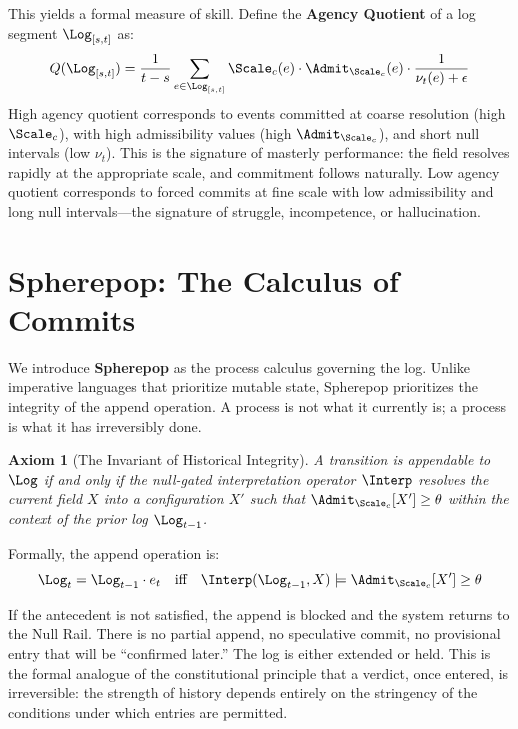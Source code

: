 \documentclass[11pt,oneside]{book}
\newtheorem{axiom}{Axiom}[chapter]
\begin{document}
This yields a formal measure of skill. Define the \textbf{Agency Quotient} of a log segment $\Log_{[s,t]}$ as:
\begin{equation}
    Q(\Log_{[s,t]}) = \frac{1}{t-s} \sum_{e \in \Log_{[s,t]}} \Scale_c(e) \cdot \Admit_{\Scale_c}(e) \cdot \frac{1}{\nu_t(e) + \epsilon}
\end{equation}
High agency quotient corresponds to events committed at coarse resolution (high $\Scale_c$), with high admissibility values (high $\Admit_{\Scale_c}$), and short null intervals (low $\nu_t$). This is the signature of masterly performance: the field resolves rapidly at the appropriate scale, and commitment follows naturally. Low agency quotient corresponds to forced commits at fine scale with low admissibility and long null intervals---the signature of struggle, incompetence, or hallucination.

\section{Spherepop: The Calculus of Commits}

We introduce \textbf{Spherepop} as the process calculus governing the log. Unlike imperative languages that prioritize mutable state, Spherepop prioritizes the integrity of the append operation. A process is not what it currently is; a process is what it has irreversibly done.

\begin{axiom}[The Invariant of Historical Integrity]
A transition is appendable to $\Log$ if and only if the null-gated interpretation operator $\Interp$ resolves the current field $X$ into a configuration $X'$ such that $\Admit_{\Scale_c}[X'] \ge \theta$ within the context of the prior log $\Log_{t-1}$.
\end{axiom}

Formally, the append operation is:
\begin{equation}
    \Log_t = \Log_{t-1} \cdot e_t \quad \text{iff} \quad \Interp(\Log_{t-1}, X) \models \Admit_{\Scale_c}[X'] \ge \theta
\end{equation}

If the antecedent is not satisfied, the append is blocked and the system returns to the Null Rail. There is no partial append, no speculative commit, no provisional entry that will be ``confirmed later.'' The log is either extended or held. This is the formal analogue of the constitutional principle that a verdict, once entered, is irreversible: the strength of history depends entirely on the stringency of the conditions under which entries are permitted.
\end{document}
